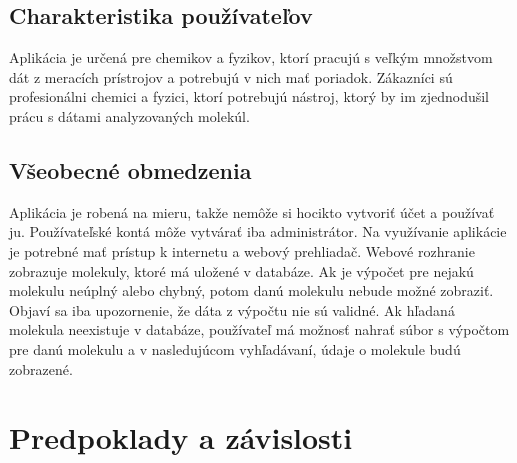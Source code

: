 \documentclass[12pt,a4paper]{article}
\begin{document}
\subsection{Charakteristika používateľov}
Aplikácia je určená pre chemikov a fyzikov, ktorí pracujú s veľkým množstvom dát z meracích prístrojov a potrebujú v nich mať poriadok. Zákazníci sú profesionálni chemici a fyzici, ktorí potrebujú nástroj, ktorý by im zjednodušil prácu s dátami analyzovaných molekúl.

\subsection{Všeobecné obmedzenia}
Aplikácia je robená na mieru, takže nemôže si hocikto vytvoriť účet a používať ju. Používateľské kontá môže vytvárať iba administrátor. Na využívanie aplikácie je potrebné mať prístup k internetu a webový prehliadač. Webové rozhranie zobrazuje molekuly, ktoré má uložené v databáze. Ak je výpočet pre nejakú molekulu neúplný alebo chybný, potom danú molekulu nebude možné zobraziť. Objaví sa iba upozornenie, že dáta z výpočtu nie sú validné. Ak hľadaná molekula neexistuje v databáze, používateľ má možnosť nahrať súbor s výpočtom pre danú molekulu a v nasledujúcom vyhľadávaní, údaje o molekule budú zobrazené.

\section{Predpoklady a závislosti}
\end{document}
